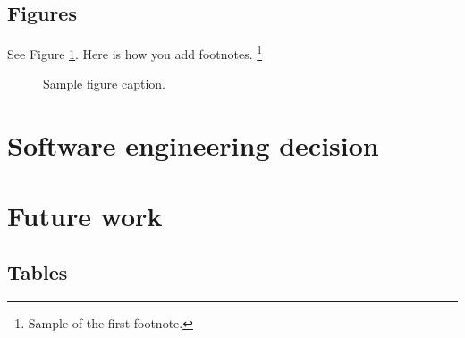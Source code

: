\documentclass{article}
\begin{document}
\pagebreak 

\subsection{Figures}
See Figure \ref{fig:fig1}. Here is how you add footnotes. \footnote{Sample of the first footnote.}

\begin{figure}
	\centering
	\fbox{\rule[-.5cm]{4cm}{4cm} \rule[-.5cm]{4cm}{0cm}}
	\caption{Sample figure caption.}
	\label{fig:fig1}
\end{figure}



\section{Software engineering decision}

\section{Future work}





\subsection{Tables}
\lipsum[12]


\printbibliography
\end{document}
